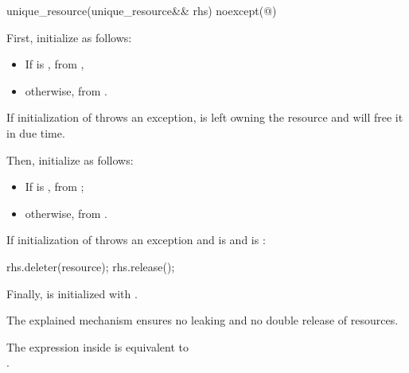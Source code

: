 \documentclass[ebook,11pt,article]{memoir}
\begin{document}
\begin{itemdecl}
unique_resource(unique_resource&& rhs) noexcept(@\seebelow@)
\end{itemdecl}

\begin{itemdescr}
\pnum
\effects First, initialize  as follows: 
\begin{itemize}
\item If  is , from , 
\item otherwise, from .  
\end{itemize}

\pnum
\begin{note}
If initialization of  throws an exception,  is left owning the resource and will free it in due time.
\end{note}

\pnum
Then, initialize  as follows: 
\begin{itemize}
\item If  is , 
from ;
\item otherwise, 
from . 
\end{itemize}

\pnum
If initialization of  throws an exception and 
  is  
and  is : %
\begin{codeblock}
    rhs.deleter(resource); rhs.release();
\end{codeblock}

\pnum
Finally,  is initialized with .

\pnum
\begin{note}
The explained mechanism ensures no leaking and no double release of resources.
\end{note}

\pnum
\remarks
The expression inside  is equivalent to \\
 \tcode{\&\&} .
\end{itemdescr}
\end{document}
